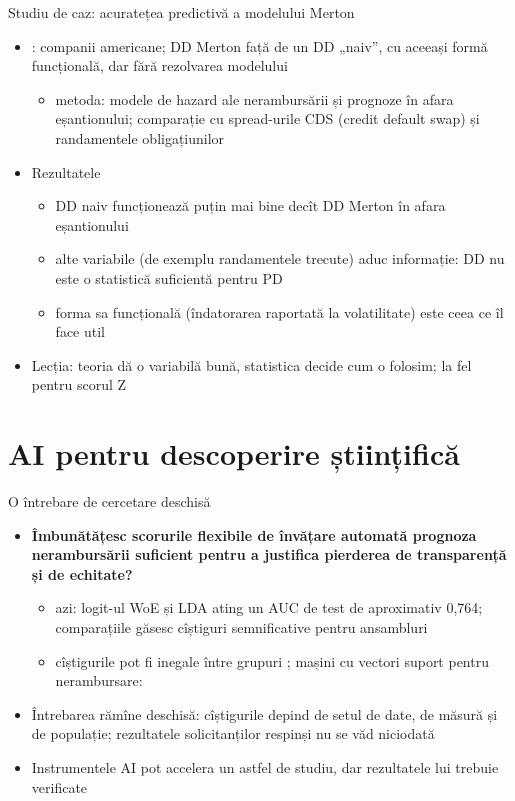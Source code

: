 \begin{frame}{Studiu de caz: acuratețea predictivă a modelului Merton}
\itemsize{\small}
\begin{itemize}
    \item {}: companii americane; DD Merton față de un DD „naiv”, cu aceeași formă funcțională, dar fără rezolvarea modelului
    \begin{itemize}
        \item metoda: modele de hazard ale nerambursării și prognoze în afara eșantionului; comparație cu spread-urile CDS (credit default swap) și randamentele obligațiunilor
    \end{itemize}
    \item Rezultatele
    \begin{itemize}
        \item DD naiv funcționează puțin mai bine decît DD Merton în afara eșantionului
        \item alte variabile (de exemplu randamentele trecute) aduc informație: DD nu este o statistică suficientă pentru PD
        \item forma sa funcțională (îndatorarea raportată la volatilitate) este ceea ce îl face util
    \end{itemize}
    \item Lecția: teoria dă o variabilă bună, statistica decide cum o folosim; la fel pentru scorul Z
\end{itemize}
\end{frame}


\section{AI pentru descoperire științifică}

\begin{frame}{O întrebare de cercetare deschisă}
\itemsize{\small}
\begin{itemize}
    \item \textbf{Îmbunătățesc scorurile flexibile de învățare automată prognoza nerambursării suficient pentru a justifica pierderea de transparență și de echitate?}
    \begin{itemize}
        \item azi: logit-ul WoE și LDA ating un AUC de test de aproximativ 0{,}764; comparațiile găsesc cîștiguri semnificative pentru ansambluri 
        \item cîștigurile pot fi inegale între grupuri ; mașini cu vectori suport pentru nerambursare: 
    \end{itemize}
    \item Întrebarea rămîne deschisă: cîștigurile depind de setul de date, de măsură și de populație; rezultatele solicitanților respinși nu se văd niciodată
    \item Instrumentele AI pot accelera un astfel de studiu, dar rezultatele lui trebuie verificate 
\end{itemize}
\end{frame}

